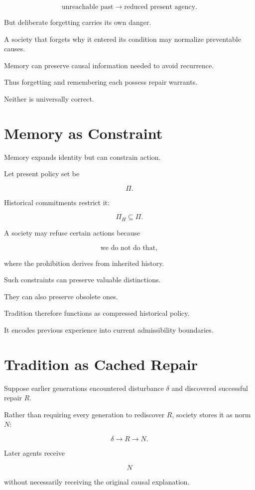 \documentclass[11pt,oneside]{book}
\theoremstyle{definition}
\theoremstyle{remark}
\begin{document}
\[
\text{unreachable past}
\rightarrow
\text{reduced present agency}.
\]

But deliberate forgetting carries its own danger.

A society that forgets why it entered its condition may normalize preventable causes.

Memory can preserve causal information needed to avoid recurrence.

Thus forgetting and remembering each possess repair warrants.

Neither is universally correct.

\section{Memory as Constraint}

Memory expands identity but can constrain action.

Let present policy set be

\[
\Pi.
\]

Historical commitments restrict it:

\[
\Pi_H
\subseteq
\Pi.
\]

A society may refuse certain actions because

\[
\text{we do not do that},
\]

where the prohibition derives from inherited history.

Such constraints can preserve valuable distinctions.

They can also preserve obsolete ones.

Tradition therefore functions as compressed historical policy.

It encodes previous experience into current admissibility boundaries.

\section{Tradition as Cached Repair}

Suppose earlier generations encountered disturbance \(\delta\) and discovered successful repair \(R\).

Rather than requiring every generation to rediscover \(R\), society stores it as norm \(N\):

\[
\delta
\rightarrow
R
\rightarrow
N.
\]

Later agents receive

\[
N
\]

without necessarily receiving the original causal explanation.
\end{document}

